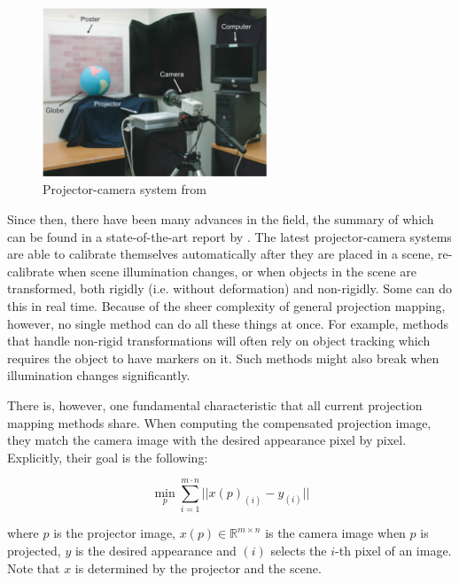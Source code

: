 \begin{figure}[ht]
    \centering
    \includegraphics[width=0.6\textwidth]{images/01-procam.png}
    \caption{Projector-camera system from \citet{Grossberg2004}}
    \label{fig:intro_procam}
\end{figure}

Since then, there have been many advances in the field, the summary of which can be found in a state-of-the-art report by \citet{Grundhofer2018}. The latest projector-camera systems are able to calibrate themselves automatically after they are placed in a scene, re-calibrate when scene illumination changes, or when objects in the scene are transformed, both rigidly (i.e. without deformation) and non-rigidly. Some can do this in real time. Because of the sheer complexity of general projection mapping, however, no single method can do all these things at once. For example, methods that handle non-rigid transformations will often rely on object tracking which requires the object to have markers on it. Such methods might also break when illumination changes significantly.

There is, however, one fundamental characteristic that all current projection mapping methods share. When computing the compensated projection image, they match the camera image with the desired appearance pixel by pixel. Explicitly, their goal is the following:

\begin{equation}
    \label{eq:projection_mapping-per_pixel}
    \min_p \sum_{i=1}^{m \cdot n} || x(p)_{(i)} - y_{(i)} ||
\end{equation}

where \(p\) is the projector image, \(x(p) \in \mathbb{R}^{m \times n}\) is the camera image when \(p\) is projected, \(y\) is the desired appearance and \((i)\) selects the \(i\)-th pixel of an image. Note that \(x\) is determined by the projector and the scene.

